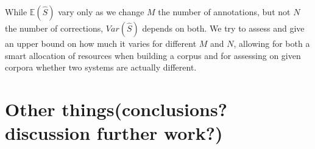 \documentclass[english]{article}
\begin{document}
While $\mathbb{E}\left(\hat{S}\right)$ vary only as we change $M$
the number of annotations, but not $N$ the number of corrections,
$Var(\hat{S})$ depends on both. We try to assess and give an upper
bound on how much it varies for different $M$ and $N$, allowing
for both a smart allocation of resources when building a corpus and
for assessing on given corpora whether two systems are actually different.

\section{Other things(conclusions? discussion further work?)}



\end{document}
